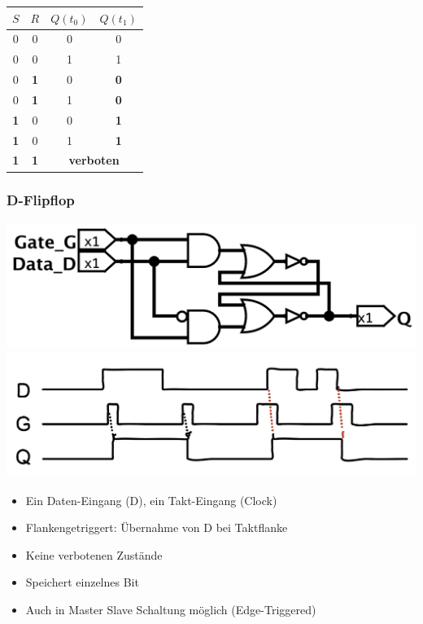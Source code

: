 \documentclass[a4paper,6pt]{article}
\begin{document}
\begin{multicols*}{3}
\begin{center}
    \begin{tabular}{|c|c||c|c|}
    \hline
    $S$ & $R$ & $Q(t_0)$ & $Q(t_1)$ \\ \hline
    0 & 0 & 0 & 0 \\ \hline
    0 & 0 & 1 & 1 \\ \hline
    0 & \textbf{1} & 0 & \textbf{0} \\ \hline
    0 & \textbf{1} & 1 & \textbf{0} \\ \hline
    \textbf{1} & 0 & 0 & \textbf{1} \\ \hline
    \textbf{1} & 0 & 1 & \textbf{1} \\ \hline
    \textbf{1} & \textbf{1} & \multicolumn{2}{c|}{\textbf{verboten}} \\ \hline
    \end{tabular}
\end{center}

\subsubsection*{D-Flipflop}




\begin{center}
    \includegraphics[width=1\linewidth]{resources/D_FlipFlop.png}
    \includegraphics[width=1\linewidth]{resources/D-FlipFlop_Timing.png}
\end{center}

\begin{itemize}
    \item Ein Daten-Eingang (D), ein Takt-Eingang (Clock)
    \item Flankengetriggert: Übernahme von D bei Taktflanke
    \item Keine verbotenen Zustände
    \item Speichert einzelnes Bit
    \item Auch in Master Slave Schaltung möglich (Edge-Triggered)
\end{itemize}


\end{multicols*}
\end{document}

